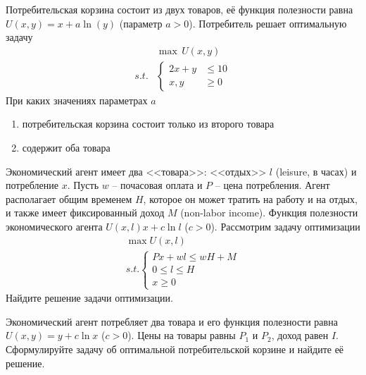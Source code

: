 \begin{exercise}[*]
Потребительская корзина состоит из двух товаров, её функция
полезности равна $U(x,y)=x+a\ln(y)$ (параметр $a>0$).
Потребитель решает оптимальную задачу
\begin{align*}
	& \max\, U(x,y) \\ 
	s.t.&\left\{\begin{aligned}
		2x+y&\leq 10 \\ x,y&\geq0
	\end{aligned}\right.
\end{align*}
При каких значениях параметрах $a$ 
\begin{enumerate}
	\item потребительская корзина состоит только из 
	второго товара
	\item содержит оба товара
\end{enumerate}
\end{exercise}

\begin{exercise}[*]%
Экономический агент имеет два <<товара>>: <<отдых>> $l$ (leisure, в часах) и потребление $x$.
Пусть $w$ -- почасовая оплата и $P$ -- цена потребления. Агент располагает общим временем $H$,
которое он может тратить на работу и на отдых, и также имеет фиксированный доход $M$
(non-labor income). Функция полезности экономического агента $U(x,l)x+c\ln l$ ($c>0$). 
Рассмотрим задачу оптимизации
\begin{gather*}
	\max U(x,l) \\
	s.t.\left\{\begin{gathered}
		Px+wl\leq wH+M \\ 0\leq l\leq H \\ x\geq0
	\end{gathered}
	\right.
\end{gather*}
Найдите решение задачи оптимизации.
\end{exercise}

\begin{exercise}
Экономический агент потребляет два товара и его функция полезности равна
$U(x,y)=y+c\ln x$ ($c>0$). Цены на товары равны $P_1$ и $P_2$, доход равен $I$.
Сформулируйте задачу об оптимальной потребительской корзине и найдите её решение.
\end{exercise}